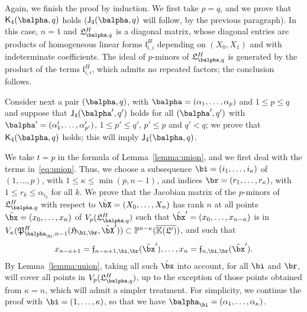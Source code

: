 \documentclass[12pt]{article}
\begin{document}
Again, we finish the proof by induction. We first take $p=q$, and we
prove that $\assJ_4(\balpha,q)$ holds ($\assI_4(\balpha,q)$ will
follow, by the previous paragraph). In this case, $n=1$ and
$\mathfrak{L}^H_{\balpha,q}$ is a diagonal matrix, whose diagonal
entries are products of homogeneous linear forms
$\mathfrak{l}^H_{i,i}$ depending on $(X_0,X_1)$ and with indeterminate
coefficients. The ideal of $p$-minors of $\mathfrak{L}^H_{\balpha,q}$
is generated by the product of the terms $\mathfrak{l}^H_{i,i}$, which
admits no repeated factors; the conclusion follows.

Consider next a pair $(\balpha,q)$, with
$\balpha=(\alpha_1,\dots,\alpha_p)$ and $1 \le p \le q$ and suppose
that $\assI_4(\balpha',q')$ holds for all $(\balpha',q')$ with
$\balpha'=(\alpha'_1,\dots,\alpha'_{p'})$, $1 \le p' \le q'$, $p' \le
p$ and $q' < q$; we prove that $\assJ_4(\balpha,q)$ holds; this will
imply $\assI_4(\balpha,q)$.

We take $t=p$ in the formula of Lemma~\ref{lemma:union}, and we first
deal with the terms in~\eqref{eq:union}.  Thus, we choose a
subsequence $\bi=(i_1,\dots,i_\kappa)$ of $(1,\dots,p)$, with $1 \le \kappa\le
\min(p,n-1)$, and indices $\br=(r_1,\dots,r_\kappa)$, with $ 1\le r_k \le
\alpha_{i_k}$ for all $k$. We prove that the Jacobian matrix of the $p$-minors of $\mathfrak{L}^H_{\balpha,q}$
with respect to $\tilde\bX=(X_0,\dots,X_n)$ has rank $n$ at all points $\tilde\bx=(x_0,\dots,x_n)$ of
$V_p(\mathfrak{L}^H_{\balpha,q})$  such that
$\tilde\bx'=(x_0,\dots,x_{n-\kappa})$ is in
$V_\kappa(\mathfrak{P}^H_{\balpha_\bi,n-1}(\mathfrak{H}_{\bi,\br},\tilde\bX')) \subset
\P^{n-\kappa}(\KKGpbar)$, and such that
\begin{align}\label{eq:subsX}
  x_{n-\kappa+1}=\mathfrak{f}_{n-\kappa+1,\bi,\br}(\tilde\bx'),\dots,x_{n}=\mathfrak{f}_{n,\bi,\br}(\tilde\bx').
\end{align}
By Lemma~\ref{lemma:union}, taking all such $\tilde\bx$ into account,
for all $\bi$ and $\br$, will cover all points in
$V_p(\mathfrak{L}^H_{\balpha,q})$, up to the exception of those points
obtained from $\kappa=n$, which will admit a simpler treatment.
For simplicity, we continue the proof with $\bi=(1,\dots,\kappa)$, so
that we have $\balpha_\bi=(\alpha_1,\dots,\alpha_\kappa)$.  
\end{document}
